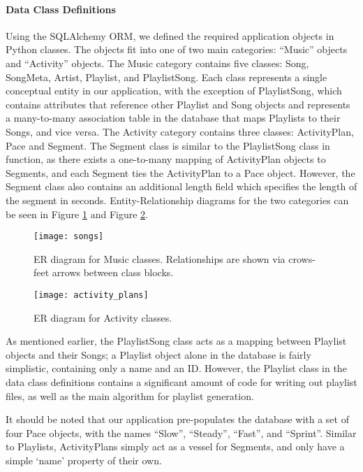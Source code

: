 \documentclass{article}
\begin{document}
\paragraph{Data Class Definitions}

Using the SQLAlchemy ORM, we defined the required application objects in Python classes. The objects fit into one of two main categories: ``Music'' objects and ``Activity'' objects. The Music category contains five classes: Song, SongMeta, Artist, Playlist, and PlaylistSong. Each class represents a single conceptual entity in our application, with the exception of PlaylistSong, which contains attributes that reference other Playlist and Song objects and represents a many-to-many association table in the database that maps Playlists to their Songs, and vice versa. The Activity category contains three classes: ActivityPlan, Pace and Segment. The Segment class is similar to the PlaylistSong class in function, as there exists a one-to-many mapping of ActivityPlan objects to Segments, and each Segment ties the ActivityPlan to a Pace object. However, the Segment class also contains an additional length field which specifies the length of the segment in seconds. Entity-Relationship diagrams for the two categories can be seen in Figure \ref{fig:songs} and Figure \ref{fig:activity_plans}.

\begin{figure}[h]
\centering
\captionsetup{justification=centering}
\texttt{[image: songs]}
\caption{ER diagram for Music classes. Relationships are shown via crows-feet arrows between class blocks.}
\label{fig:songs}
\end{figure}

\begin{figure}[h]
\centering
\captionsetup{justification=centering}
\texttt{[image: activity\_plans]}
\caption{ER diagram for Activity classes.}
\label{fig:activity_plans}
\end{figure}

As mentioned earlier, the PlaylistSong class acts as a mapping between Playlist objects and their Songs; a Playlist object alone in the database is fairly simplistic, containing only a name and an ID. However, the Playlist class in the data class definitions contains a significant amount of code for writing out playlist files, as well as the main algorithm for playlist generation.

It should be noted that our application pre-populates the database with a set of four Pace objects, with the names ``Slow'', ``Steady'', ``Fast'', and ``Sprint''. Similar to Playlists, ActivityPlans simply act as a vessel for Segments, and only have a simple `name' property of their own.
\end{document}
